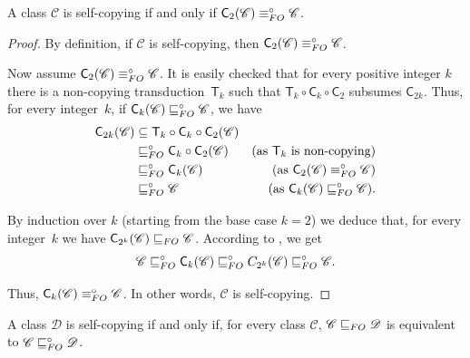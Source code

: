 \documentclass{lmcs}
\newcommand{\Cc}{\mathscr{C}}
\newcommand{\Dd}{\mathscr{D}}
\renewcommand{\FO}{{\rm FO}}
\theoremstyle{definition}
\newcommand{\dnnc}{is self-copying\xspace}
\begin{document}
\begin{fact}
	A class $\Cc$ \dnnc if and only if $\mathsf C_2(\Cc)\equiv_\FO^\circ \Cc$.
\end{fact}
\begin{proof}
	By definition, if $\Cc$ \dnnc, then $\mathsf C_2(\Cc)\equiv_\FO^\circ \Cc$.
	
	Now assume $\mathsf C_2(\Cc)\equiv_\FO^\circ \Cc$.
	It is easily checked that for every positive integer $k$ there is a non-copying transduction~$\mathsf T_k$ such that $\mathsf T_k\circ\mathsf C_k\circ\mathsf C_2$ subsumes $\mathsf C_{2k}$. 	
	Thus, for every integer~$k$, if $\mathsf C_k(\Cc)\sqsubseteq_\FO^\circ \Cc$, we have
\begin{align*}
	\mathsf C_{2k}(\Cc)&\subseteq \mathsf T_k\circ\mathsf C_k\circ\mathsf C_2(\Cc)\\
	&\sqsubseteq_\FO^\circ \mathsf C_k\circ\mathsf C_2(\Cc)&\text{(as $\mathsf T_k$ is non-copying)}\\
	&\sqsubseteq_\FO^\circ \mathsf C_k(\Cc)&\text{(as $\mathsf C_2(\Cc)\equiv_\FO^\circ\Cc$)}\\
	&\sqsubseteq_\FO^\circ\Cc&\text{(as $\mathsf C_k(\Cc)\sqsubseteq_\FO^\circ \Cc$)}.
\end{align*}	

By induction over $k$ (starting from the base case $k=2$) we deduce that, for every integer~$k$ we have $\mathsf C_{2^k}(\Cc)\sqsubseteq_\FO \Cc$. According to , we get
\[\Cc\sqsubseteq_\FO^\circ \mathsf C_k(\Cc)\sqsubseteq_\FO^\circ 
C_{2^k}(\Cc)\sqsubseteq_\FO^\circ \Cc.\]

Thus, $\mathsf C_k(\Cc)\equiv_\FO^\circ \Cc$. In other words, 
$\Cc$ \dnnc.
\end{proof}
\begin{fact}\label{fact:non-copy}
	A class $\Dd$ \dnnc if and only if, for every class $\Cc$,
	$\Cc\sqsubseteq_\FO\Dd$ is equivalent to $\Cc\sqsubseteq_\FO^\circ\Dd$.
\end{fact}
\end{document}

